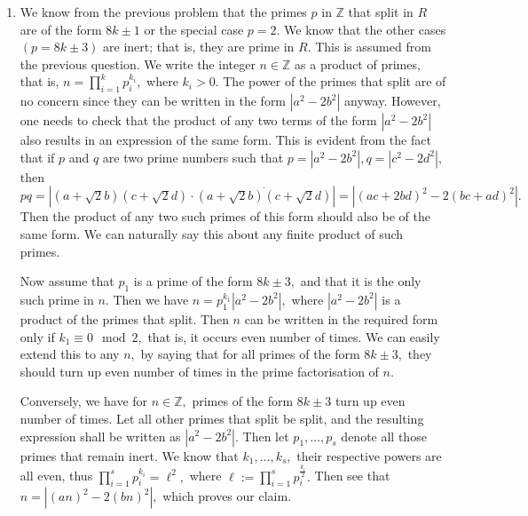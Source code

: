 \documentclass[]{article}
\begin{document}
\begin{enumerate}
\begin{enumerate}
\end{enumerate}
\item We know from the previous problem that the primes $p$ in $\mathbb{Z}$ that split in $ R$ are of the form $ 8k \pm 1$ or the special case $p=2.$ We know that the other cases $(p=8k \pm 3)$ are inert; that is, they are prime in $R.$ This is assumed from the previous question. We write the integer $n \in \mathbb{Z}$ as a product of primes, that is, $n=\prod_{i=1}^{k}p_i^{k_i},$ where $k_i >0.$
The power of the primes that split are of no concern since they can be written in the form $|a^2-2b^2|$ anyway. However, one needs to check that the product of any two terms of the form $|a^2-2b^2| $ also results in an expression of the same form. This is evident from the fact that if $p$ and $q$ are two prime numbers such that $p=|a^2-2b^2|, q=|c^2-2d^2|,$ then $ pq= |(a+\sqrt{2}b)(c+\sqrt{2}d) \cdot \overline{(a+\sqrt{2}b)(c+\sqrt{2}d)}|= |(ac+2bd)^2-2(bc+ad)^2|.$ Then the product of any two such primes of this form should also be of the same form. We can naturally say this about any finite product of such primes. 
 
Now assume that $p_1$ is a prime of the form $8k \pm 3,$ and that it is the only such prime in $n.$ Then we have $n=p_1^{k_1}|a^2-2b^2|,$ where $|a^2-2b^2|$ is a product of the primes that split. Then  
$n$ can be written in the required form only if $k_1 \equiv 0 \mod 2,$ that is, it occurs even number of times. We can easily extend this to any $n,$ by saying that for all primes of the form $8k \pm 3,$ they should turn up even number of times in the prime factorisation of $n.$

Conversely, we have for $n \in \mathbb{Z},$ primes of the form $8k \pm 3$ turn up even number of times. Let all other primes that split be split, and the resulting expression shall be written as $|a^2-2b^2|.$ Then let $p_1,\dots, p_s $ denote all those primes that remain inert. We know that $k_1,\dots, k_s,$ their respective powers are all even, thus $ \prod_{i=1}^s p_i^{k_i}= \ell^2,$ where $\ell := \prod_{i=1}^s p_i^{\frac{k_i}{2}}.$ Then see that $n= |(an)^2-2(bn)^2|,$ which proves our claim.


\end{enumerate}
\end{document}
